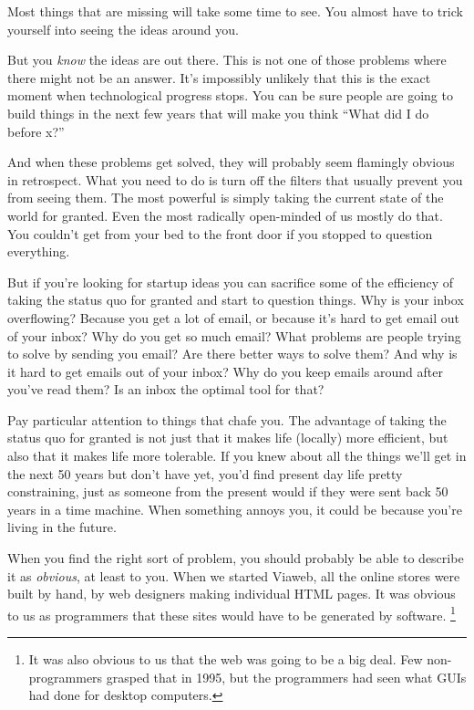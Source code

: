 \documentclass[12pt]{book}
\begin{document}
Most things that are missing will take some time to see. You almost have
to trick yourself into seeing the ideas around you.

But you \emph{know} the ideas are out there. This is not one of those
problems where there might not be an answer. It's impossibly unlikely
that this is the exact moment when technological progress stops. You can
be sure people are going to build things in the next few years that will
make you think ``What did I do before x?''

And when these problems get solved, they will probably seem flamingly
obvious in retrospect. What you need to do is turn off the filters that
usually prevent you from seeing them. The most powerful is simply taking
the current state of the world for granted. Even the most radically
open-minded of us mostly do that. You couldn't get from your bed to the
front door if you stopped to question everything.

But if you're looking for startup ideas you can sacrifice some of the
efficiency of taking the status quo for granted and start to question
things. Why is your inbox overflowing? Because you get a lot of email,
or because it's hard to get email out of your inbox? Why do you get so
much email? What problems are people trying to solve by sending you
email? Are there better ways to solve them? And why is it hard to get
emails out of your inbox? Why do you keep emails around after you've
read them? Is an inbox the optimal tool for that?

Pay particular attention to things that chafe you. The advantage of
taking the status quo for granted is not just that it makes life
(locally) more efficient, but also that it makes life more tolerable. If
you knew about all the things we'll get in the next 50 years but don't
have yet, you'd find present day life pretty constraining, just as
someone from the present would if they were sent back 50 years in a time
machine. When something annoys you, it could be because you're living in
the future.

When you find the right sort of problem, you should probably be able to
describe it as \emph{obvious}, at least to you. When we started Viaweb,
all the online stores were built by hand, by web designers making
individual HTML pages. It was obvious to us as programmers that these
sites would have to be generated by software. \footnote{It was also obvious to us that the web was going to be a big
deal. Few non-programmers grasped that in 1995, but the programmers had
seen what GUIs had done for desktop computers.}
\end{document}

